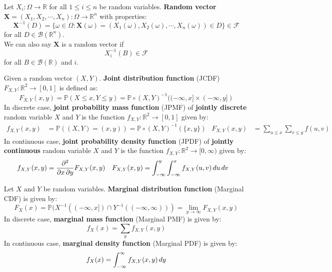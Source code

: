 \documentclass{huhtakm-template-book}
\newcommand{\prob}{\mathbb{P}}
\begin{document}
\newpage
\begin{sdefn}
	Let $X_{i}:\Omega\to\mathbb{R}$ for all $1\leq i\leq n$ be random variables. \textbf{Random vector} $\mathbf{X}=(X_{1},X_{2},\cdots,X_{n}):\Omega\to\mathbb{R}^{n}$ with properties:
	\begin{equation*}
		\mathbf{X}^{-1}(D)=\{\omega\in\Omega:\mathbf{X}(\omega)=(X_{1}(\omega),X_{2}(\omega),\cdots,X_{n}(\omega))\in D\}\in\mathcal{F}
	\end{equation*}
	for all $D\in\mathcal{B}(\mathbb{R}^{n})$.\\
	We can also say $\mathbf{X}$ is a random vector if
	\begin{equation*}
		X_{i}^{-1}(B)\in\mathcal{F}
	\end{equation*}
	for all $B\in\mathcal{B}(\mathbb{R})$ and $i$.
\end{sdefn}
\begin{sdefn}
	Given a random vector $(X,Y)$. \textbf{Joint distribution function} (JCDF) $F_{X,Y}:\mathbb{R}^{2}\to[0,1]$ is defined as:
	\begin{equation*}
		F_{X,Y}(x,y)=\prob(X\leq x,Y\leq y)=\prob\circ(X,Y)^{-1}((-\infty,x]\times(-\infty,y])
	\end{equation*}
	In discrete case, \textbf{joint probability mass function} (JPMF) of \textbf{jointly discrete} random variable $X$ and $Y$ is the function $f_{X,Y}:\mathbb{R}^{2}\to[0,1]$ given by:
	\begin{align*}
		f_{X,Y}(x,y)&=\prob((X,Y)=(x,y))=\prob\circ(X,Y)^{-1}(\{x,y\}) & F_{X,Y}(x,y)&=\sum_{u\leq x}\sum_{v\leq y}f(u,v)
	\end{align*}
	In continuous case, \textbf{joint probability density function} (JPDF) of \textbf{jointly continuous} random variable $X$ and $Y$ is the function $f_{X,Y}:\mathbb{R}^{2}\to[0,\infty)$ given by:
	\begin{align*}
		f_{X,Y}(x,y)&=\pdv*{F_{X,Y}(x,y)}{x,y} & F_{X,Y}(x,y)&=\int_{-\infty}^{y}\int_{-\infty}^{x}f_{X,Y}(u,v)\,du\,dv
	\end{align*}
\end{sdefn}
\begin{sdefn}
	Let $X$ and $Y$ be random variables. \textbf{Marginal distribution function} (Marginal CDF) is given by:
	\begin{equation*}
		F_{X}(x)=\prob(X^{-1}((-\infty,x])\cap Y^{-1}((-\infty,\infty)))=\lim_{y\to\infty}F_{X,Y}(x,y)
	\end{equation*}
	In discrete case, \textbf{marginal mass function} (Marginal PMF) is given by:
	\begin{equation*}
		f_{X}(x)=\sum_{y}f_{X,Y}(x,y)
	\end{equation*}
	In continuous case, \textbf{marginal density function} (Marginal PDF) is given by:
	\begin{equation*}
		f_{X}(x)=\int_{-\infty}^{\infty} f_{X,Y}(x,y)\,dy
	\end{equation*}
\end{sdefn}
\end{document}
